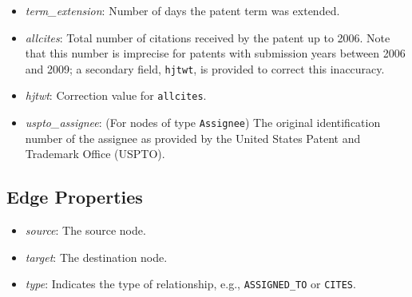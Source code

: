 \begin{itemize}
    \item \emph{term\_extension}: Number of days the patent term was extended.
    \item \emph{allcites}: Total number of citations received by the patent up to 2006. Note that this number is imprecise for patents with submission years between 2006 and 2009; a secondary field, \texttt{hjtwt}, is provided to correct this inaccuracy.
    \item \emph{hjtwt}: Correction value for \texttt{allcites}.
    \item \emph{uspto\_assignee}: (For nodes of type \texttt{Assignee}) The original identification number of the assignee as provided by the United States Patent and Trademark Office (USPTO).
\end{itemize}

\subsection*{Edge Properties}
\begin{itemize}
    \item \emph{source}: The source node.
    \item \emph{target}: The destination node.
    \item \emph{type}: Indicates the type of relationship, e.g., \texttt{ASSIGNED\_TO} or \texttt{CITES}.
\end{itemize}